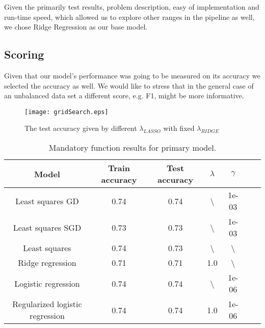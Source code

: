 \documentclass[a4paper, 10pt, conference]{ieeeconf}      %
\begin{document}
Given the primarily test results, problem description, easy of implementation and run-time speed, which allowed us to explore other ranges in the pipeline as well, we chose Ridge Regression as our base model.

\subsection{Scoring}

Given that our model's performance was going to be measured on its accuracy we selected the accuracy as well. We would like to stress that in the general case of an unbalanced data set a different score, e.g. F1, might be more informative.

\begin{figure}[h!]
    \centering
    \texttt{[image: gridSearch.eps]}
     \caption{The test accuracy given by different $\lambda_{LASSO}$ with fixed $\lambda_{RIDGE}$ }
     \label{fig:Barrier}
\end{figure}



\begin{table}[h!]
\scriptsize
\begin{tabular}{| c | c | c | c | c | c | c |}
      \hline
      Model          & Train accuracy & Test accuracy & $\lambda$ & $\gamma$ \\%
      \hline
      Least squares GD   & 0.74  &  0.74     & \textbackslash  &  1e-03         \\%
      \hline
      Least squares SGD     & 0.73 &  0.73     &  \textbackslash   &  1e-03          \\%
      \hline
      Least squares & 0.74    &  0.73     & \textbackslash   &  \textbackslash          \\%
      \hline
      Ridge regression  & 0.71  &  0.71     &  1.0  &  \textbackslash        \\%
      \hline
      Logistic regression & 0.74  &  0.74     & \textbackslash  &  1e-06       \\%
      \hline
      Regularized logistic regression & 0.74  &  0.74    & 1.0  &  1e-06  \\%
      \hline
\end{tabular}
\caption{Mandatory function results for primary model.}
\label{table:test}
\end{table}
\end{document}

